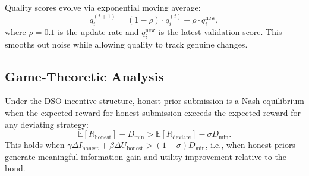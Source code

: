 Quality scores evolve via exponential moving average:
\begin{equation}
    q_i^{(t+1)} = (1 - \rho) \cdot q_i^{(t)} + \rho \cdot q_i^{\text{new}},
\end{equation}
where $\rho = 0.1$ is the update rate and $q_i^{\text{new}}$ is the latest
validation score. This smooths out noise while allowing quality to track genuine
changes.

\subsection{Game-Theoretic Analysis}

\begin{proposition}
Under the DSO incentive structure, honest prior submission is a Nash equilibrium
when the expected reward for honest submission exceeds the expected reward for
any deviating strategy:
\begin{equation}
    \mathbb{E}[R_{\text{honest}}] - D_{\min} > \mathbb{E}[R_{\text{deviate}}] - \sigma D_{\min}.
\end{equation}
This holds when $\gamma \Delta I_{\text{honest}} + \beta \Delta U_{\text{honest}} > (1 - \sigma) D_{\min}$,
i.e., when honest priors generate meaningful information gain and utility
improvement relative to the bond.
\end{proposition}

